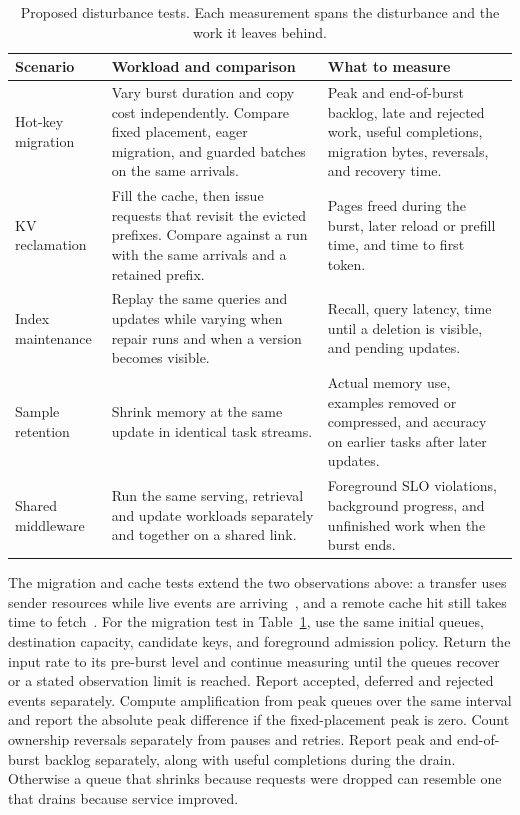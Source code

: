 \documentclass[manuscript]{acmart}
\begin{document}
\begin{table}[t]
\small
\centering
\setlength{\tabcolsep}{3pt}
\caption{Proposed disturbance tests. Each measurement spans the disturbance and the work it leaves behind.}
\label{tab:disturbance-evaluation-matrix}
\begin{tabular}{@{}p{}p{}p{}@{}}
\toprule
Scenario & Workload and comparison & What to measure \\
\midrule
Hot-key migration & Vary burst duration and copy cost independently. Compare fixed placement, eager migration, and guarded batches on the same arrivals. & Peak and end-of-burst backlog, late and rejected work, useful completions, migration bytes, reversals, and recovery time. \\
KV reclamation & Fill the cache, then issue requests that revisit the evicted prefixes. Compare against a run with the same arrivals and a retained prefix. & Pages freed during the burst, later reload or prefill time, and time to first token. \\
Index maintenance & Replay the same queries and updates while varying when repair runs and when a version becomes visible. & Recall, query latency, time until a deletion is visible, and pending updates. \\
Sample retention & Shrink memory at the same update in identical task streams. & Actual memory use, examples removed or compressed, and accuracy on earlier tasks after later updates. \\
Shared middleware & Run the same serving, retrieval and update workloads separately and together on a shared link. & Foreground SLO violations, background progress, and unfinished work when the burst ends. \\
\bottomrule
\end{tabular}
\end{table}

The migration and cache tests extend the two observations above: a transfer uses sender resources while live events are arriving~\cite{nasir2019megaphone}, and a remote cache hit still takes time to fetch~\cite{hu2024memserve}. For the migration test in Table~\ref{tab:disturbance-evaluation-matrix}, use the same initial queues, destination capacity, candidate keys, and foreground admission policy. Return the input rate to its pre-burst level and continue measuring until the queues recover or a stated observation limit is reached. Report accepted, deferred and rejected events separately. Compute amplification from peak queues over the same interval and report the absolute peak difference if the fixed-placement peak is zero. Count ownership reversals separately from pauses and retries. Report peak and end-of-burst backlog separately, along with useful completions during the drain. Otherwise a queue that shrinks because requests were dropped can resemble one that drains because service improved.
\end{document}
